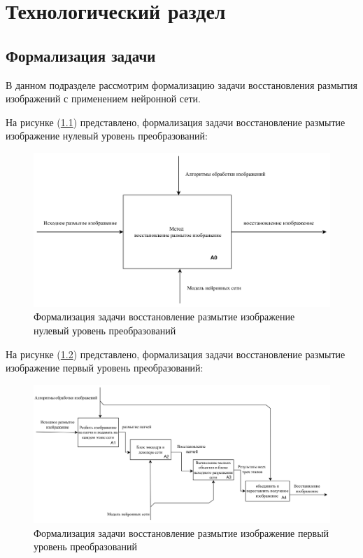 \chapter{Технологический раздел}

\section{Формализация задачи}

В данном подразделе рассмотрим формализацию задачи восстановления размытия изображений с применением нейронной сети.

На рисунке (\ref{fig:method-desc-a0}) представлено, формализация задачи восстановление размытие изображение нулевый уровень преобразований: 
\begin{figure}[H]
	\centering
	\includegraphics[width=1\linewidth]{assets/idef0-A0.png}
	\caption{Формализация задачи восстановление размытие изображение нулевый уровень преобразований}
	\label{fig:method-desc-a0}
\end{figure}


На рисунке (\ref{fig:method-desc-a1}) представлено, формализация задачи восстановление размытие изображение первый уровень преобразований: 
\begin{figure}[H]
	\centering
	\includegraphics[width=1\linewidth]{assets/idef0-A1.png}
	\caption{Формализация задачи восстановление размытие изображение первый уровень преобразований}
	\label{fig:method-desc-a1}
\end{figure}


